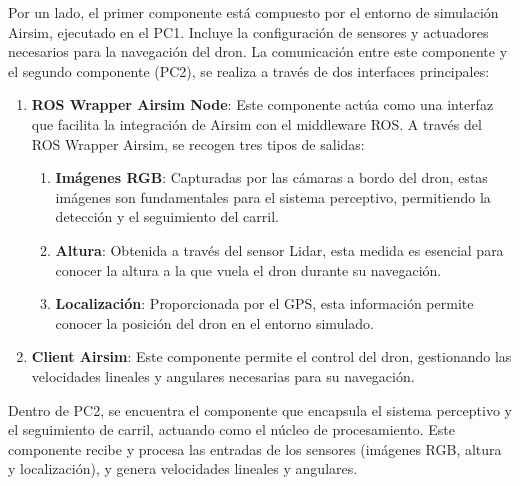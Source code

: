 Por un lado, el primer componente está compuesto por el entorno de simulación Airsim, ejecutado en el PC1. Incluye la configuración de sensores y actuadores necesarios 
para la navegación del dron. La comunicación entre este componente y el segundo componente (PC2), se realiza a través de dos interfaces principales: 

\begin{enumerate}
  \item \textbf{ROS Wrapper Airsim Node}: Este componente actúa como una interfaz que facilita la integración de Airsim con el middleware ROS. A través del ROS Wrapper Airsim, 
  se recogen tres tipos de salidas: 
    \begin{enumerate}
      \item \textbf{Imágenes RGB}: Capturadas por las cámaras a bordo del dron, estas imágenes son fundamentales para el sistema perceptivo, permitiendo la detección y el 
      seguimiento del carril.
      \item \textbf{Altura}: Obtenida a través del sensor Lidar, esta medida es esencial para conocer la altura a la que vuela el dron durante su navegación. 
      \item \textbf{Localización}: Proporcionada por el GPS, esta información permite conocer la posición del dron en el entorno simulado. 
    \end{enumerate}

  \item \textbf{Client Airsim}: Este componente permite el control del dron, gestionando las velocidades lineales y angulares necesarias para su navegación. 
\end{enumerate}

Dentro de PC2, se encuentra el componente que encapsula el sistema perceptivo y el seguimiento de carril, actuando como el núcleo de 
procesamiento. Este componente recibe y procesa las entradas de los sensores (imágenes RGB, altura y localización), y genera velocidades lineales y angulares.

